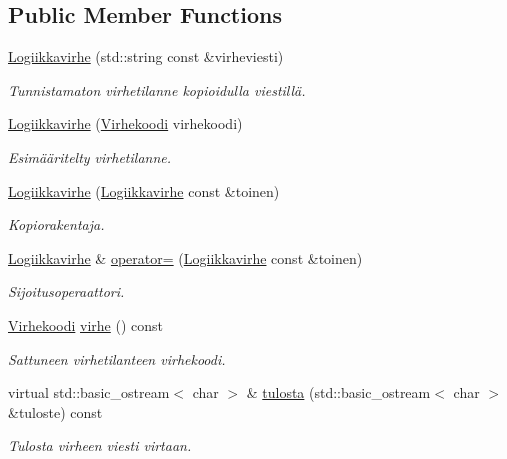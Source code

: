 \subsection*{Public Member Functions}
\begin{DoxyCompactItemize}
\item 
\hyperlink{class_julkinen_1_1_logiikkavirhe_a95b0e31452062d57a34d5ee1e7b1545b}{Logiikkavirhe} (std\+::string const \&virheviesti)
\begin{DoxyCompactList}\small\item\em Tunnistamaton virhetilanne kopioidulla viestillä. \end{DoxyCompactList}\item 
\hyperlink{class_julkinen_1_1_logiikkavirhe_a82c17b4ae69d3701def7dee519b69024}{Logiikkavirhe} (\hyperlink{class_julkinen_1_1_logiikkavirhe_afbf716c9c72439df3d8638576942d14d}{Virhekoodi} virhekoodi)
\begin{DoxyCompactList}\small\item\em Esimääritelty virhetilanne. \end{DoxyCompactList}\item 
\hyperlink{class_julkinen_1_1_logiikkavirhe_a2ff42b2fc57b19638aebc7b8aa6f62d8}{Logiikkavirhe} (\hyperlink{class_julkinen_1_1_logiikkavirhe}{Logiikkavirhe} const \&toinen)
\begin{DoxyCompactList}\small\item\em Kopiorakentaja. \end{DoxyCompactList}\item 
\hyperlink{class_julkinen_1_1_logiikkavirhe}{Logiikkavirhe} \& \hyperlink{class_julkinen_1_1_logiikkavirhe_a9e680776140205960612e4b3b3be8e28}{operator=} (\hyperlink{class_julkinen_1_1_logiikkavirhe}{Logiikkavirhe} const \&toinen)
\begin{DoxyCompactList}\small\item\em Sijoitusoperaattori. \end{DoxyCompactList}\item 
\hyperlink{class_julkinen_1_1_logiikkavirhe_afbf716c9c72439df3d8638576942d14d}{Virhekoodi} \hyperlink{class_julkinen_1_1_logiikkavirhe_a453d06482aa51a80b27ab043d9efffaa}{virhe} () const 
\begin{DoxyCompactList}\small\item\em Sattuneen virhetilanteen virhekoodi. \end{DoxyCompactList}\item 
virtual std\+::basic\+\_\+ostream$<$ char $>$ \& \hyperlink{class_julkinen_1_1_logiikkavirhe_a298ce4b9c3d1887d5be431bea89645da}{tulosta} (std\+::basic\+\_\+ostream$<$ char $>$ \&tuloste) const 
\begin{DoxyCompactList}\small\item\em Tulosta virheen viesti virtaan. \end{DoxyCompactList}\end{DoxyCompactItemize}
